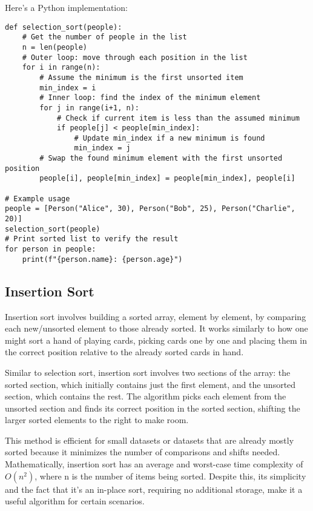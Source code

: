 \documentclass{article}
\begin{document}
Here's a Python implementation:
\begin{verbatim}
def selection_sort(people):
    # Get the number of people in the list
    n = len(people)
    # Outer loop: move through each position in the list
    for i in range(n):
        # Assume the minimum is the first unsorted item
        min_index = i
        # Inner loop: find the index of the minimum element
        for j in range(i+1, n):
            # Check if current item is less than the assumed minimum
            if people[j] < people[min_index]:
                # Update min_index if a new minimum is found
                min_index = j
        # Swap the found minimum element with the first unsorted position
        people[i], people[min_index] = people[min_index], people[i]

# Example usage
people = [Person("Alice", 30), Person("Bob", 25), Person("Charlie", 20)]
selection_sort(people)
# Print sorted list to verify the result
for person in people:
    print(f"{person.name}: {person.age}")
\end{verbatim}

\subsection{Insertion Sort}

Insertion sort involves building a sorted array, element by element, by comparing each new/unsorted element to those already sorted. It works similarly to how one might sort a hand of playing cards, picking cards one by one and placing them in the correct position relative to the already sorted cards in hand. 

Similar to selection sort, insertion sort involves two sections of the array: the sorted section, which initially contains just the first element, and the unsorted section, which contains the rest. The algorithm picks each element from the unsorted section and finds its correct position in the sorted section, shifting the larger sorted elements to the right to make room.

This method is efficient for small datasets or datasets that are already mostly sorted because it minimizes the number of comparisons and shifts needed. Mathematically, insertion sort has an average and worst-case time complexity of $O(n^2)$, where n is the number of items being sorted. Despite this, its simplicity and the fact that it's an in-place sort, requiring no additional storage, make it a useful algorithm for certain scenarios.
\end{document}
